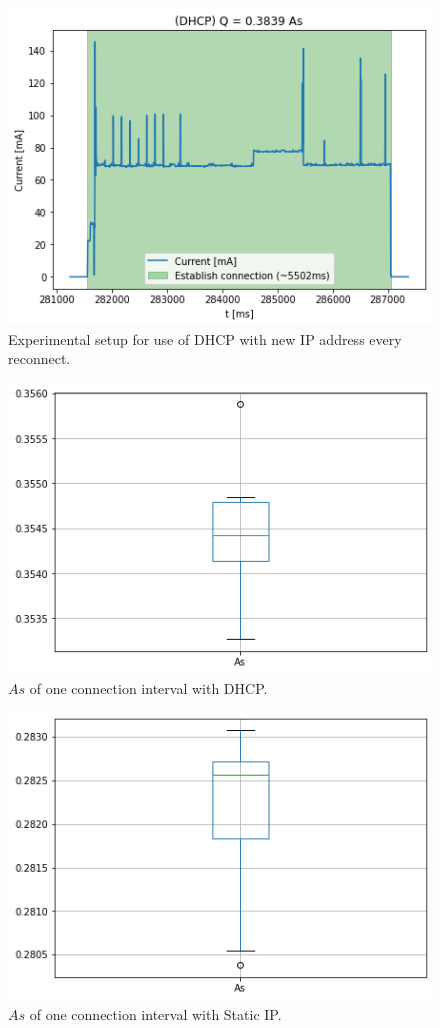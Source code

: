 \begin{figure}[h]
    \centering
    \includegraphics[width =\linewidth]{fig/dhcp.png}
    \caption{Experimental setup for use of DHCP with new IP address every reconnect.}
    \label{fig:dhcp}
\end{figure}
\begin{figure}[h]
    \centering
    \includegraphics[width =\linewidth]{fig/dhcp_boxplot.png}
    \caption{$As$ of one connection interval with DHCP.}
    \label{fig:dhcp_boxplot}
\end{figure}
\begin{figure}[h]
    \centering
    \includegraphics[width =\linewidth]{fig/static_boxplot.png}
    \caption{$As$ of one connection interval with Static IP.}
    \label{fig:static_boxplot}
\end{figure}
\pagebreak